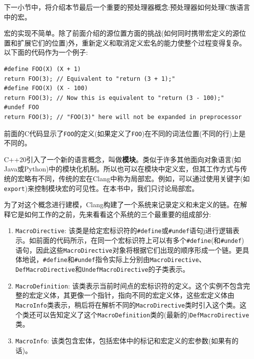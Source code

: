 下一小节中，将介绍本节最后一个重要的预处理器概念:预处理器如何处理C族语言中的宏。


宏的实现不简单。除了前面介绍的源位置方面的挑战(如何同时携带宏定义的源位置和扩展它们的位置)外，重新定义和取消定义宏名的能力使整个过程变得复杂。以下面的代码作为一个例子:

\begin{lstlisting}[style=styleCXX]
#define FOO(X) (X + 1)
return FOO(3); // Equivalent to "return (3 + 1);"
#define FOO(X) (X - 100)
return FOO(3); // Now this is equivalent to "return (3 - 100);"
#undef FOO
return FOO(3); // "FOO(3)" here will not be expanded in preprocessor
\end{lstlisting}

前面的C代码显示了\texttt{FOO}的定义(如果定义了\texttt{FOO})在不同的词法位置(不同的行)上是不同的。

\begin{tcolorbox}[colback=blue!5!white,colframe=blue!75!black, fonttitle=\bfseries,title=局部宏与模块宏]
\hspace*{0.7cm}C++20引入了一个新的语言概念，叫做\textbf{模块}。类似于许多其他面向对象语言(如Java或Python)中的模块化机制。所以也可以在模块中定义宏，但其工作方式与传统的宏略有不同，传统的宏在Clang中称为局部宏。例如，可以通过使用关键字(如\texttt{export})来控制模块宏的可见性。在本书中，我们只讨论局部宏。
\end{tcolorbox}

为了对这个概念进行建模，Clang构建了一个系统来记录定义和未定义的链。在解释它是如何工作的之前，先来看看这个系统的三个最重要的组成部分:

\begin{enumerate}
\item \texttt{MacroDirective}: 该类是给定宏标识符的\texttt{\#define}或\texttt{\#undef}语句j进行逻辑表示。如前面的代码所示，在同一个宏标识符上可以有多个\texttt{\#define}(和\texttt{\#undef})语句，因此这些\texttt{MacroDirective}对象将根据它们出现的顺序形成一个链。更具体地说，\texttt{\#define}和\texttt{\#undef}指令实际上分别由\texttt{MacroDirective}、\texttt{DefMacroDirective}和\texttt{UndefMacroDirective}的子类表示。

\item \texttt{MacroDefinition}: 该类表示当前时间点的宏标识符的定义。这个实例不包含完整的宏定义体，其更像一个指针，指向不同的宏定义体，这些宏定义体由\texttt{MacroInfo}类表示，稍后将在解析不同的\texttt{MacroDirective}类时引入这个类。这个类还可以告知定义了这个\texttt{MacroDefinition}类的(最新的)\texttt{DefMacroDirective}类。

\item \texttt{MacroInfo}: 该类包含宏体，包括宏体中的标记和宏定义的宏参数(如果有的话)。

\end{enumerate}

